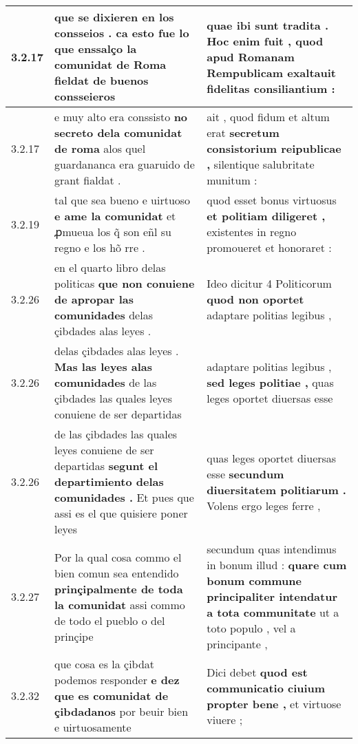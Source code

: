 \begin{tabular}{|p{1cm}|p{6.5cm}|p{6.5cm}|}
3.2.17 & que se dixieren en los consseios . \textbf{ ca esto fue lo que enssalço la comunidat de Roma } fieldat de buenos consseieros & quae ibi sunt tradita . \textbf{ Hoc enim fuit , } quod apud Romanam Rempublicam exaltauit fidelitas consiliantium : \\\hline
3.2.17 & e muy alto era conssisto \textbf{ no secreto dela comunidat de roma } alos quel guardananca era guaruido de grant fialdat . & ait , quod fidum et altum erat \textbf{ secretum consistorium reipublicae , } silentique salubritate munitum : \\\hline
3.2.19 & tal que sea bueno e uirtuoso \textbf{ e ame la comunidat } et ꝓmueua los q̃ son eñl su regno e los hõ rre . & quod esset bonus virtuosus \textbf{ et politiam diligeret , } existentes in regno promoueret et honoraret : \\\hline
3.2.26 & en el quarto libro delas politicas \textbf{ que non conuiene de apropar las comunidades } delas çibdades alas leyes . & Ideo dicitur 4 Politicorum \textbf{ quod non oportet } adaptare politias legibus , \\\hline
3.2.26 & delas çibdades alas leyes . \textbf{ Mas las leyes alas comunidades } de las çibdades las quales leyes conuiene de ser departidas & adaptare politias legibus , \textbf{ sed leges politiae , } quas leges oportet diuersas esse \\\hline
3.2.26 & de las çibdades las quales leyes conuiene de ser departidas \textbf{ segunt el departimiento delas comunidades . } Et pues que assi es el que quisiere poner leyes & quas leges oportet diuersas esse \textbf{ secundum diuersitatem politiarum . } Volens ergo leges ferre , \\\hline
3.2.27 & Por la qual cosa commo el bien comun sea entendido \textbf{ prinçipalmente de toda la comunidat } assi commo de todo el pueblo o del prinçipe & secundum quas intendimus in bonum illud : \textbf{ quare cum bonum commune principaliter intendatur a tota communitate } ut a toto populo , vel a principante , \\\hline
3.2.32 & que cosa es la çibdat podemos responder \textbf{ e dez que es comunidat de çibdadanos } por beuir bien e uirtuosamente & Dici debet \textbf{ quod est communicatio ciuium propter bene , } et virtuose viuere ; \\\hline

\end{tabular}
